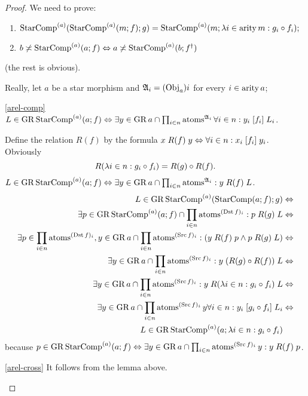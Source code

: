 \begin{proof}
We need to prove:
\begin{enumerate}
\item \label{arel-comp}$\operatorname{StarComp}^{(a)}(\operatorname{StarComp}^{(a)}(m;f);g)=\operatorname{StarComp}^{(a)}(m;\lambda i\in\operatorname{arity} m:g_{i}\circ f_{i});$
\item \label{arel-cross}$b\not\asymp\operatorname{StarComp}^{(a)}(a;f)\Leftrightarrow a\not\asymp\operatorname{StarComp}^{(a)}(b;f^{\dagger})$
\end{enumerate}
(the rest is obvious).

Really, let $a$ be a star morphism and $\mathfrak{A}_i=(\operatorname{Obj}_a)i$ for every $i\in\operatorname{arity} a$;
\begin{widedisorder}
\item [{\ref{arel-comp}}] $L\in\operatorname{GR}\operatorname{StarComp}^{(a)}(a;f)\Leftrightarrow\exists y\in\operatorname{GR} a\cap\prod_{i\in n}\operatorname{atoms}^{\mathfrak{A}_{i}}\forall i\in n:y_{i}\mathrel{\left[f_{i}\right]}L_{i}$.


Define the relation $R(f)$ by the formula $x\mathrel{R(f)}y\Leftrightarrow\forall i\in n:x_{i}\mathrel{\left[f_{i}\right]}y_{i}$.
Obviously
\[
R(\lambda i\in n:g_{i}\circ f_{i})=R(g)\circ R(f).
\]
$L\in\operatorname{GR}\operatorname{StarComp}^{(a)}(a;f)\Leftrightarrow\exists y\in\operatorname{GR} a\cap\prod_{i\in n}\operatorname{atoms}^{\mathfrak{A}_{i}}:y\mathrel{R(f)}L$.
\begin{align*}
L\in\operatorname{GR}\operatorname{StarComp}^{(a)}(\operatorname{StarComp}(a;f);g) & \Leftrightarrow\\
\exists p\in\operatorname{GR}\operatorname{StarComp}^{(a)}(a;f)\cap\prod_{i\in n}\operatorname{atoms}^{(\operatorname{Dst} f)_{i}}:p\mathrel{R(g)}L & \Leftrightarrow\\
\exists p\in\prod_{i\in n}\operatorname{atoms}^{(\operatorname{Dst} f)_{i}},y\in\operatorname{GR} a\cap\prod_{i\in n}\operatorname{atoms}^{(\operatorname{Src} f)_{i}}:(y\mathrel{R(f)}p\land p\mathrel{R(g)}L) & \Leftrightarrow\\
\exists y\in\operatorname{GR} a\cap\prod_{i\in n}\operatorname{atoms}^{(\operatorname{Src} f)_{i}}:y\mathrel{(R(g)\circ R(f))}L & \Leftrightarrow\\
\exists y\in\operatorname{GR} a\cap\prod_{i\in n}\operatorname{atoms}^{(\operatorname{Src} f)_{i}}:y\mathrel{R(\lambda i\in n:g_{i}\circ f_{i})}L & \Leftrightarrow\\
\exists y\in\operatorname{GR} a\cap\prod_{i\in n}\operatorname{atoms}^{(\operatorname{Src} f)_{i}}y\forall i\in n:y_{i}\mathrel{\left[g_{i}\circ f_{i}\right]}L_{i} & \Leftrightarrow\\
L\in\operatorname{GR}\operatorname{StarComp}^{(a)}(a;\lambda i\in n:g_{i}\circ f_{i})
\end{align*}
because $p\in\operatorname{GR}\operatorname{StarComp}^{(a)}(a;f)\Leftrightarrow\exists y\in\operatorname{GR} a\cap\prod_{i\in n}\operatorname{atoms}^{(\operatorname{Src} f)_{i}}y:y\mathrel{R(f)}p$.

\item [{\ref{arel-cross}}] It follows from the lemma above.
\end{widedisorder}
\end{proof}
